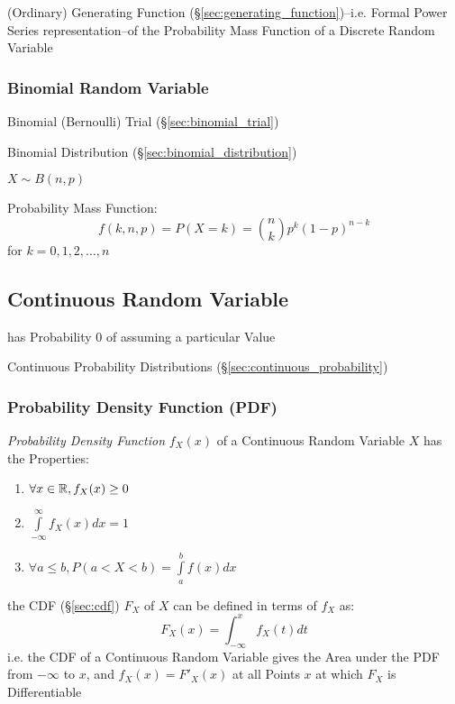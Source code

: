(Ordinary) Generating Function (\S\ref{sec:generating_function})--i.e. Formal
Power Series representation--of the Probability Mass Function of a Discrete
Random Variable



\subsubsection{Binomial Random Variable}\label{sec:binomial_random_variable}

Binomial (Bernoulli) Trial (\S\ref{sec:binomial_trial})

Binomial Distribution (\S\ref{sec:binomial_distribution})

$X \sim B(n,p)$

Probability Mass Function:
\[
  f(k,n,p) = P(X = k) = \binom{n}{k} p^k (1-p)^{n-k}
\]
for $k = 0,1,2, \ldots, n$



\subsection{Continuous Random Variable}\label{sec:continuous_random_variable}

has Probability $0$ of assuming a particular Value

\fist Continuous Probability Distributions (\S\ref{sec:continuous_probability})


\subsubsection{Probability Density Function (PDF)}\label{sec:pdf}


\emph{Probability Density Function} $f_X(x)$ of a Continuous Random Variable $X$
has the Properties:
\begin{enumerate}
  \item $\forall x \in \mathbb{R}, f_X(x) \geq 0$
  \item $\int\limits_{-\infty}^{\infty} f_X(x) dx = 1$
  \item $\forall a \leq b, P (a < X < b) = \int\limits_a^b f(x) dx$
\end{enumerate}
the CDF (\S\ref{sec:cdf}) $F_X$ of $X$ can be defined in terms of $f_X$ as:
\[
  F_X(x) = \int_{-\infty}^x f_X(t)dt
\]
i.e. the CDF of a Continuous Random Variable gives the Area under the PDF from
$-\infty$ to $x$, and $f_X(x) = F'_X(x)$ at all Points $x$ at which $F_X$ is
Differentiable

